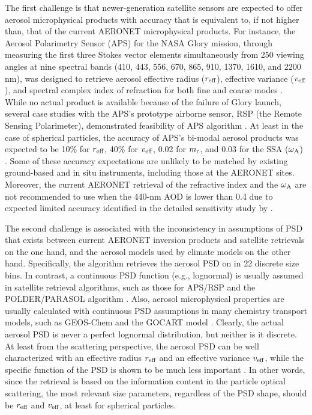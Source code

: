 The first challenge is that newer-generation satellite sensors are expected to
offer aerosol microphysical products with accuracy that is equivalent to, if
not higher than, that of the current AERONET microphysical products. For
instance, the Aerosol Polarimetry Sensor (APS) for the NASA Glory mission,
through measuring the first three Stokes vector elements simultaneously from
250 viewing angles at nine spectral bands (410, 443, 556, 670, 865, 910, 1370,
1610, and 2200 nm), was designed to retrieve aerosol effective radius ($r_\text{eff}$),
effective variance ($v_\text{eff}$), and spectral complex index of refraction for both
fine and coarse modes \citep{Mishchenko07}. While no actual product is
available because of the failure of Glory launch, several case studies with the
APS's prototype airborne sensor, RSP (the Remote Sensing Polarimeter),
demonstrated feasibility of APS algorithm \citep{Chowdhary02,Chowdhary05,
Mishchenko04,Waquet09}. At least in the case of
spherical particles, the accuracy of APS’s bi-modal aerosol products was
expected to be 10\% for $r_\text{eff}$, 40\% for $v_\text{eff}$, 0.02 for $m_\text{r}$, and 0.03 for the SSA
($\omega_\text{A}$) \citep{Mishchenko07}. Some of these accuracy expectations are
unlikely to be matched by existing ground-based and in situ instruments,
including those at the AERONET sites. Moreover, the current AERONET retrieval
of the refractive index and the $\omega_\text{A}$ are not recommended to use when the 440-nm
AOD is lower than 0.4 \citep{Holben06} due to expected limited accuracy
identified in the detailed sensitivity study by \citep{Dubovik00b}.

The second challenge is associated with the inconsistency in assumptions of PSD
that exists between current AERONET inversion products and satellite retrievals
on the one hand, and the aerosol models used by climate models on the
other hand. Specifically, the \Dub algorithm retrieves the aerosol PSD
on in 22 discrete size bins. In contrast, a continuous PSD function (e.g.,
lognormal) is usually assumed in satellite retrieval algorithms, such as those
for APS/RSP \citep{Mishchenko07, Waquet09} and the
POLDER/PARASOL algorithm \citep{Hasekamp11}. Also, aerosol microphysical
properties are usually calculated with continuous PSD assumptions in many
chemistry transport models, such as GEOS-Chem \citep{Drury10, Wang10}
and the GOCART model \citep{Chin02}. Clearly, the actual aerosol PSD
is never a perfect lognormal distribution, but neither is it discrete. At least
from the scattering perspective, the aerosol PSD can be well characterized with
an effective radius $r_\text{eff}$ and an effective variance $v_\text{eff}$, while the specific
function of the PSD is shown to be much less important \citep{Hansen74}.
In other words, since the retrieval is based on the information content
in the particle optical scattering, the most relevant size parameters,
regardless of the PSD shape, should be $r_\text{eff}$ and $v_\text{eff}$, at least for spherical
particles.

